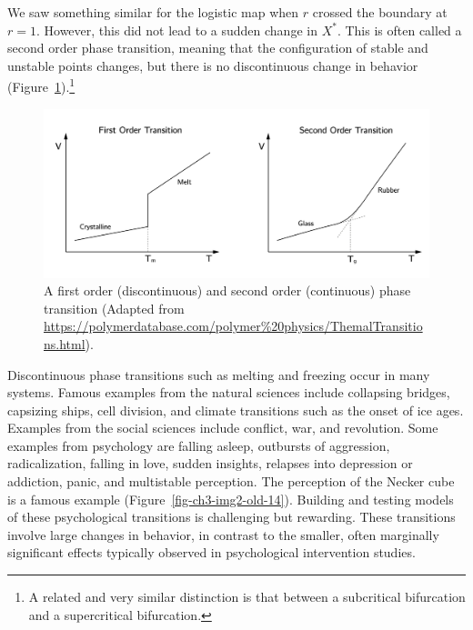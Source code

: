 \documentclass[
  a4paper,
  DIV=11,
  numbers=noendperiod,
  oneside]{scrreprt}
\begin{document}
We saw something similar for the logistic map when \(r\) crossed the
boundary at \(r = 1\). However, this did not lead to a sudden change in
\(X^{*}\). This is often called a second order phase transition, meaning
that the configuration of stable and unstable points changes, but there
is no discontinuous change in behavior
(Figure~\ref{fig-ch3-img1-old-13}).\footnote{A related and very similar
  distinction is that between a subcritical bifurcation and a
  supercritical bifurcation.}

\begin{figure}

{\centering \includegraphics{media/ch3/ch3-01__figure13.png}

}

\caption{\label{fig-ch3-img1-old-13}A first order (discontinuous) and
second order (continuous) phase transition (Adapted from
\url{https://polymerdatabase.com/polymer\%20physics/ThemalTransitions.html}).}

\end{figure}

Discontinuous phase transitions such as melting and freezing occur in
many systems. Famous examples from the natural sciences include
collapsing bridges, capsizing ships, cell division, and climate
transitions such as the onset of ice ages. Examples from the social
sciences include conflict, war, and revolution. Some examples from
psychology are falling asleep, outbursts of aggression, radicalization,
falling in love, sudden insights, relapses into depression or addiction,
panic, and multistable perception. The perception of the Necker cube is
a famous example (Figure~\ref{fig-ch3-img2-old-14}). Building and
testing models of these psychological transitions is challenging but
rewarding. These transitions involve large changes in behavior, in
contrast to the smaller, often marginally significant effects typically
observed in psychological intervention studies.
\end{document}
